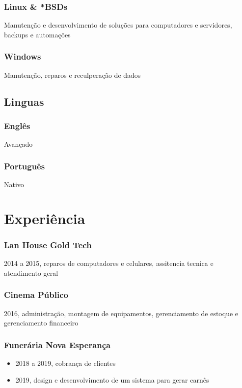 \documentclass[11pt]{article}
\begin{document}
\subsubsection{Linux \& *BSDs}
\label{sec:org04cb5ad}
Manutenção e desenvolvimento de soluções para computadores e servidores, backups e automações
\subsubsection{Windows}
\label{sec:orgde63705}
Manutenção, reparos e reculperação de dados
\subsection{Linguas}
\label{sec:orgea2d94c}
\subsubsection{Englês}
\label{sec:org8c55f8c}
Avançado
\subsubsection{Português}
\label{sec:orgeab86b7}
Nativo

\section{Experiência}
\label{sec:org9a71871}
\subsubsection{Lan House Gold Tech}
\label{sec:org56a0499}
2014 a 2015, reparos de computadores e celulares, assitencia tecnica e atendimento geral
\subsubsection{Cinema Público}
\label{sec:orgf7e06f2}
2016, administração, montagem de equipamentos, gerenciamento de estoque e gerenciamento financeiro
\subsubsection{Funerária Nova Esperança}
\label{sec:org47f7731}
\begin{itemize}
\item 2018 a 2019, cobrança de clientes
\item 2019, design e desenvolvimento de um sistema para gerar carnês
\end{itemize}
\end{document}
